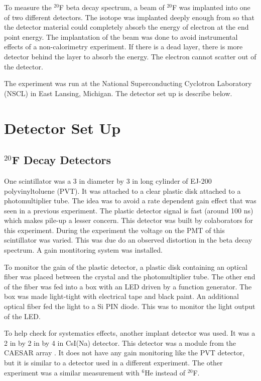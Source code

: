 

To measure the $^{20}$F beta decay spectrum, a beam of $^{20}$F was implanted into one of two different detectors.
The isotope was implanted deeply enough from so that the detector material could completely absorb the energy of electron at the end point energy.
The implantation of the beam was done to avoid instrumental effects of a non-calorimetry experiment.
If there is a dead layer, there is more detector behind the layer to absorb the energy.
The electron cannot scatter out of the detector.

The experiment was run at the National Superconducting Cyclotron Laboratory (NSCL) in East Lansing, Michigan. 
The detector set up is describe below.

\section{Detector Set Up}

\subsection{$^{20}$F Decay Detectors}
One scintillator was a 3 in diameter by 3 in long cylinder of EJ-200 polyvinyltoluene (PVT).
It was attached to a clear plastic disk attached to a photomultiplier tube.
The idea was to avoid a rate dependent gain effect that was seen in a previous experiment.
The plastic detector signal is fast (around 100 ns) which makes pile-up a lesser concern.
This detector was built by colaborators for this experiment.
During the experiment the voltage on the PMT of this scintillator was varied.
This was due do an observed distortion in the beta decay spectrum.
A gain montitoring system was installed.

To monitor the gain of the plastic detector, a plastic disk containing an optical fiber was placed between the crystal and the photomultiplier tube. 
The other end of the fiber was fed into a box with an LED driven by a function generator. 
The box was made light-tight with electrical tape and black paint.
An additional optical fiber fed the light to a Si PIN diode.
This was to monitor the light output of the LED.

To help check for systematics effects, another implant detector was used.
It was a 2 in by 2 in by 4 in  CsI(Na) detector. 
This detector was a module from the CAESAR array \cite{Wei10}.
It does not have any gain monitoring like the PVT detector, but it is similar to a detector used in a different experiment. 
The other experiment was a similar measurement with $^{6}$He instead of $^{20}$F.


